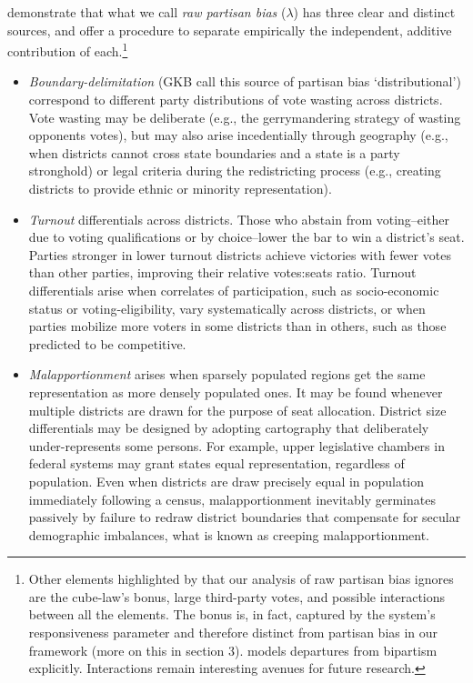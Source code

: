 \documentclass[letter,12pt]{article}
\begin{document}
\citet[][, henceforth GKB]{grofman.etalBiasMalapp.1997} demonstrate that what we call \emph{raw partisan bias} ($\lambda$) has three clear and distinct sources, and offer a procedure to separate empirically the independent, additive contribution of each.\footnote{Other elements highlighted by \citet{gudgin.taylor.1980decomposeBias} that our analysis of raw partisan bias ignores are the cube-law's bonus, large third-party votes, and possible interactions between all the elements. The bonus is, in fact, captured by the system's responsiveness parameter and therefore distinct from partisan bias in our framework (more on this in section 3). \citet{calvo.2009roadToPR} models departures from bipartism explicitly. Interactions remain interesting avenues for future research.} 

\begin{itemize}
\item \emph{Boundary-delimitation} (GKB call this source of partisan bias `distributional') correspond to different party distributions of vote wasting across districts. Vote wasting may be deliberate (e.g., the gerrymandering strategy of wasting opponents votes), but may also arise incedentially through geography (e.g., when districts cannot cross state boundaries and a state is a party stronghold) or legal criteria during the redistricting process (e.g., creating districts to provide ethnic or minority representation).
\item \emph{Turnout} differentials across districts. Those who abstain from voting--either due to voting qualifications or by choice--lower the bar to win a district's seat. Parties stronger in lower turnout districts achieve victories with fewer votes than other parties, improving their relative votes:seats ratio. Turnout differentials arise when correlates of participation, such as socio-economic status or voting-eligibility, vary systematically across districts, or when parties mobilize more voters in some districts than in others, such as those predicted to be competitive.
\item \emph{Malapportionment} arises when sparsely populated regions get the same representation as more densely populated ones. It may be found whenever multiple districts are drawn for the purpose of seat allocation. District size differentials may be designed by adopting cartography that deliberately under-represents some persons. For example, upper legislative chambers in federal systems may grant states equal representation, regardless of population. Even when districts are draw precisely equal in population immediately following a census, malapportionment inevitably germinates passively by failure to redraw district boundaries that compensate for secular demographic imbalances, what is known as creeping malapportionment.
\end{itemize} 
\end{document}
